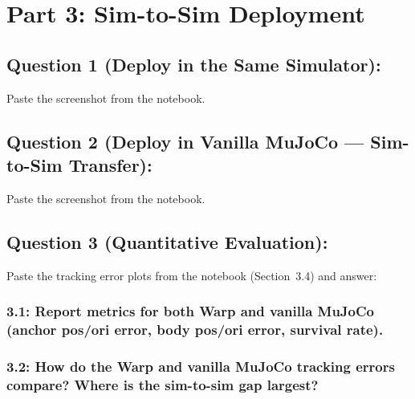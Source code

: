 \documentclass[12pt]{article}
\begin{document}
\newpage
\section*{Part 3: Sim-to-Sim Deployment}

\subsection*{Question 1 (Deploy in the Same Simulator):}
Paste the screenshot from the notebook.
\begin{solution}[height=10cm]
\end{solution}

\subsection*{Question 2 (Deploy in Vanilla MuJoCo --- Sim-to-Sim Transfer):}
Paste the screenshot from the notebook.
\begin{solution}[height=10cm]
\end{solution}

\newpage

\subsection*{Question 3 (Quantitative Evaluation):}
Paste the tracking error plots from the notebook (Section~3.4) and answer:

\subsubsection*{3.1: Report metrics for both Warp and vanilla MuJoCo (anchor pos/ori error, body pos/ori error, survival rate).}
\begin{solution}[height=10cm]
\end{solution}

\subsubsection*{3.2: How do the Warp and vanilla MuJoCo tracking errors compare? Where is the sim-to-sim gap largest?}
\begin{solution}[height=7cm]
\end{solution}
\end{document}
